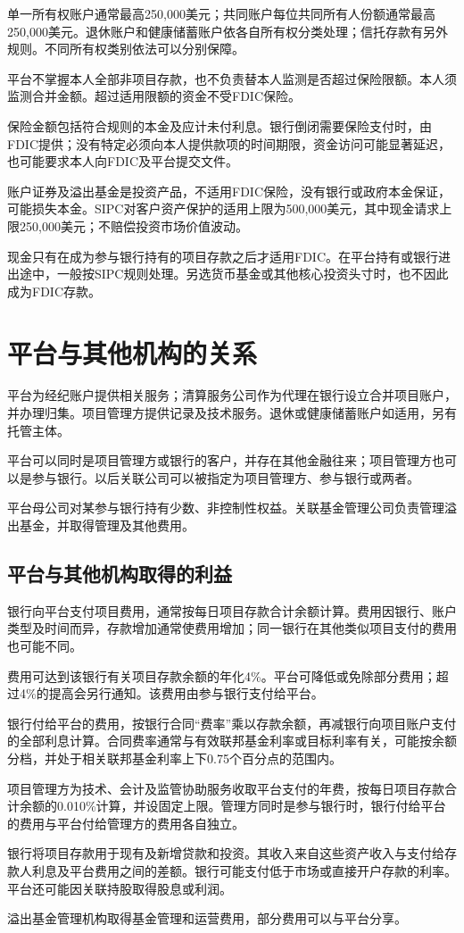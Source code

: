 \documentclass[UTF8,fontset=none,11pt,a4paper]{ctexart}
\begin{document}
单一所有权账户通常最高250,000美元；共同账户每位共同所有人份额通常最高250,000美元。退休账户和健康储蓄账户依各自所有权分类处理；信托存款有另外规则。不同所有权类别依法可以\allowbreak\mbox{分别保障。}


平台不掌握本人全部非项目存款，也不负责替本人监测是否超过保险限额。本人须监测合并金额。超过适用限额的资金不受FDIC保险。


保险金额包括符合规则的本金及应计未付利息。银行倒闭需要保险支付时，由FDIC提供；没有特定必须向本人提供款项的时间期限，资金访问可能显著延迟，也可能要求本人向FDIC及平台\allowbreak\mbox{提交文件。}


账户证券及溢出基金是投资产品，不适用FDIC保险，没有银行或政府本金保证，可能损失本金。SIPC对客户资产保护的适用上限为500,000美元，其中现金请求上限250,000美元；不赔偿投资市场\allowbreak\mbox{价值波动。}


现金只有在成为参与银行持有的项目存款之后才适用FDIC。在平台持有或银行进出途中，一般按SIPC规则处理。另选货币基金或其他核心投资头寸时，也不因此成为FDIC存款。


\section*{平台与其他机构的关系}
平台为经纪账户提供相关服务；清算服务公司作为代理在银行设立合并项目账户，并办理归集。项目管理方提供记录及技术服务。退休或健康储蓄账户如适用，另有\allowbreak\mbox{托管主体。}


平台可以同时是项目管理方或银行的客户，并存在其他金融往来；项目管理方也可以是参与银行。以后关联公司可以被指定为项目管理方、参与银\allowbreak\mbox{行或两者。}


平台母公司对某参与银行持有少数、非控制性权益。关联基金管理公司负责管理溢出基金，并取得管理及\allowbreak\mbox{其他费用。}


\subsection*{平台与其他机构取得的利益}
银行向平台支付项目费用，通常按每日项目存款合计余额计算。费用因银行、账户类型及时间而异，存款增加通常使费用增加；同一银行在其他类似项目支付的费用也\allowbreak\mbox{可能不同。}


费用可达到该银行有关项目存款余额的年化4\%。平台可降低或免除部分费用；超过4\%的提高会另行通知。该费用由参与银行支\allowbreak\mbox{付给平台。}


银行付给平台的费用，按银行合同“费率”乘以存款余额，再减银行向项目账户支付的全部利息计算。合同费率通常与有效联邦基金利率或目标利率有关，可能按余额分档，并处于相关联邦基金利率上下0.75个百分点\allowbreak\mbox{的范围内。}


项目管理方为技术、会计及监管协助服务收取平台支付的年费，按每日项目存款合计余额的0.010\%计算，并设固定上限。管理方同时是参与银行时，银行付给平台的费用与平台付给管理方的费用\allowbreak\mbox{各自独立。}


银行将项目存款用于现有及新增贷款和投资。其收入来自这些资产收入与支付给存款人利息及平台费用之间的差额。银行可能支付低于市场或直接开户存款的利率。平台还可能因关联持股取得股\allowbreak\mbox{息或利润。}


溢出基金管理机构取得基金管理和运营费用，部分费用可以与\allowbreak\mbox{平台分享。}
\end{document}
